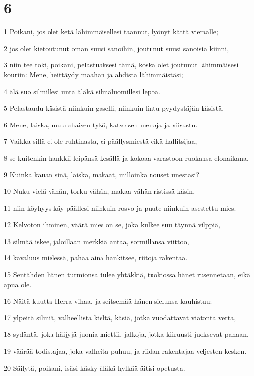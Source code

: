 \chapter{6}

\par 1 Poikani, jos olet ketä lähimmäisellesi taannut, lyönyt kättä vieraalle;
\par 2 jos olet kietoutunut oman suusi sanoihin, joutunut suusi sanoista kiinni,
\par 3 niin tee toki, poikani, pelastuaksesi tämä, koska olet joutunut lähimmäisesi kouriin: Mene, heittäydy maahan ja ahdista lähimmäistäsi;
\par 4 älä suo silmillesi unta äläkä silmäluomillesi lepoa.
\par 5 Pelastaudu käsistä niinkuin gaselli, niinkuin lintu pyydystäjän käsistä.
\par 6 Mene, laiska, muurahaisen tykö, katso sen menoja ja viisastu.
\par 7 Vaikka sillä ei ole ruhtinasta, ei päällysmiestä eikä hallitsijaa,
\par 8 se kuitenkin hankkii leipänsä kesällä ja kokoaa varastoon ruokansa elonaikana.
\par 9 Kuinka kauan sinä, laiska, makaat, milloinka nouset unestasi?
\par 10 Nuku vielä vähän, torku vähän, makaa vähän ristissä käsin,
\par 11 niin köyhyys käy päällesi niinkuin rosvo ja puute niinkuin asestettu mies.
\par 12 Kelvoton ihminen, väärä mies on se, joka kulkee suu täynnä vilppiä,
\par 13 silmää iskee, jaloillaan merkkiä antaa, sormillansa viittoo,
\par 14 kavaluus mielessä, pahaa aina hankitsee, riitoja rakentaa.
\par 15 Sentähden hänen turmionsa tulee yhtäkkiä, tuokiossa hänet rusennetaan, eikä apua ole.
\par 16 Näitä kuutta Herra vihaa, ja seitsemää hänen sielunsa kauhistuu:
\par 17 ylpeitä silmiä, valheellista kieltä, käsiä, jotka vuodattavat viatonta verta,
\par 18 sydäntä, joka häijyjä juonia miettii, jalkoja, jotka kiiruusti juoksevat pahaan,
\par 19 väärää todistajaa, joka valheita puhuu, ja riidan rakentajaa veljesten kesken.
\par 20 Säilytä, poikani, isäsi käsky äläkä hylkää äitisi opetusta.
